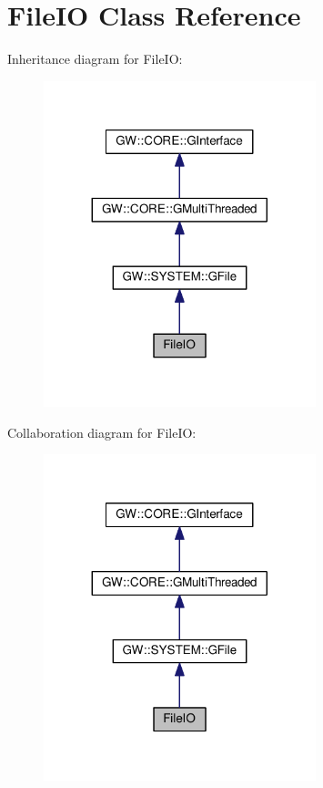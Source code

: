 \hypertarget{classFileIO}{}\section{File\+IO Class Reference}
\label{classFileIO}


Inheritance diagram for File\+IO\+:\nopagebreak
\begin{figure}[H]
\begin{center}
\leavevmode
\includegraphics[width=224pt]{classFileIO__inherit__graph}
\end{center}
\end{figure}


Collaboration diagram for File\+IO\+:\nopagebreak
\begin{figure}[H]
\begin{center}
\leavevmode
\includegraphics[width=224pt]{classFileIO__coll__graph}
\end{center}
\end{figure}
